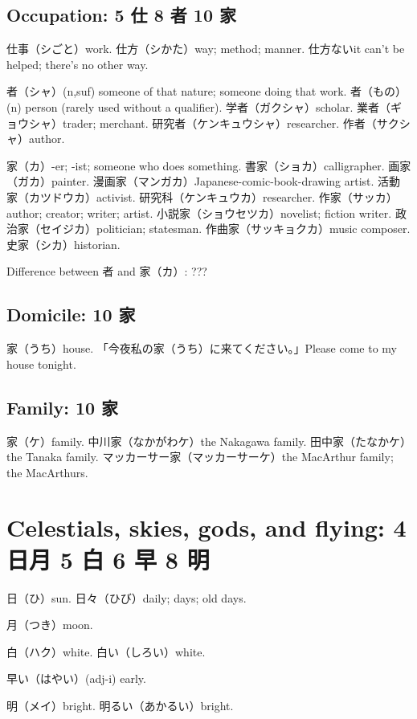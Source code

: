 \subsection{Occupation: 5 仕 8 者 10 家}

仕事（シごと）work.
仕方（シかた）way; method; manner.
仕方ないit can't be helped; there's no other way.

者（シャ）(n,suf) someone of that nature; someone doing that work.
者（もの）(n) person (rarely used without a qualifier).
学者（ガクシャ）scholar.
業者（ギョウシャ）trader; merchant.
研究者（ケンキュウシャ）researcher.
作者（サクシャ）author.

家（カ）-er; -ist; someone who does something.
書家（ショカ）calligrapher.
画家（ガカ）painter.
漫画家（マンガカ）Japanese-comic-book-drawing artist.
活動家（カツドウカ）activist.
研究科（ケンキュウカ）researcher.
作家（サッカ）author; creator; writer; artist.
小説家（ショウセツカ）novelist; fiction writer.
政治家（セイジカ）politician; statesman.
作曲家（サッキョクカ）music composer.
史家（シカ）historian.

Difference between 者 and 家（カ）: ???

\subsection{Domicile: 10 家}

家（うち）house.
「今夜私の家（うち）に来てください。」Please come to my house tonight.

\subsection{Family: 10 家}

家（ケ）family.
中川家（なかがわケ）the Nakagawa family.
田中家（たなかケ）the Tanaka family.
マッカーサー家（マッカーサーケ）the MacArthur family; the MacArthurs.

\section{Celestials, skies, gods, and flying: 4 日月 5 白 6 早 8 明}

日（ひ）sun.
日々（ひび）daily; days; old days.

月（つき）moon.

白（ハク）white.
白い（しろい）white.

早い（はやい）(adj-i) early.

明（メイ）bright.
明るい（あかるい）bright.

